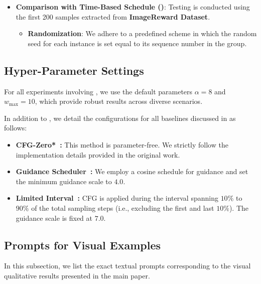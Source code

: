 \begin{itemize}
    \item \textbf{Comparison with Time-Based Schedule ()}:
    Testing is conducted using the first 200 samples extracted from \textbf{ImageReward Dataset}.
    \begin{itemize}
        \item \textbf{Randomization}: We adhere to a predefined scheme in which the random seed for each instance is set equal to its sequence number in the group.
    \end{itemize}
    
\end{itemize}

\subsection{Hyper-Parameter Settings}

 For all experiments involving \mtdbk, we use the default parameters $\alpha = 8$ and $w_{\max} = 10$, which provide robust results across diverse scenarios.

In addition to \mtdbk, we detail the configurations for all baselines discussed in  as follows:

\begin{itemize}
 \item \textbf{CFG-Zero*~\citep{fan2025cfg0}:} This method is parameter-free. We strictly follow the implementation details provided in the original work.

 \item \textbf{Guidance Scheduler~\citep{xianalysis}:} We employ a cosine schedule for guidance and set the minimum guidance scale to $4.0$.

 \item \textbf{Limited Interval~\citep{kynkaanniemi2024applying}:} CFG is applied during the interval spanning $10\%$ to $90\%$ of the total sampling steps (i.e., excluding the first and last $10\%$). The guidance scale is fixed at $7.0$.
 \end{itemize}

\subsection{Prompts for Visual Examples}
\label{app:prompts}

In this subsection, we list the exact textual prompts corresponding to the visual qualitative results presented in the main paper.

